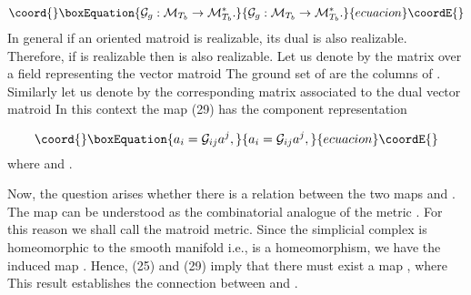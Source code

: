 \documentclass[a4paper,12pt]{article}
\begin{document}
\begin{equation}\coord{}\boxEquation{
\mathcal{G}_{g}:\mathcal{M}_{T_{b}}\rightarrow \mathcal{M}_{T_{b}}^{\ast }.
\label{29}
}{
\mathcal{G}_{g}:\mathcal{M}_{T_{b}}\rightarrow \mathcal{M}_{T_{b}}^{\ast }.
}{ecuacion}\coordE{}\end{equation}
In general if an oriented matroid is realizable, its dual is also
realizable. Therefore, if \coordHE{} is realizable then \coordHE{} is also realizable. Let us denote by \coordHE{} the \coordHE{}
matrix over a field \coordHE{} representing the vector matroid \coordHE{} The ground set \coordHE{} of \coordHE{} are the columns
of \coordHE{}. Similarly let us denote by \coordHE{} the corresponding matrix
associated to the dual vector matroid \coordHE{} In
this context the map (29) has the component representation

\begin{equation}\coord{}\boxEquation{
a_{i}=\mathcal{G}_{ij}a^{j},  \label{30}
}{
a_{i}=\mathcal{G}_{ij}a^{j},  }{ecuacion}\coordE{}\end{equation}
where \coordHE{} and \coordHE{}.

Now, the question arises whether there is a relation between the two maps \coordHE{}
and \coordHE{}. The map \coordHE{} can be understood as the
combinatorial analogue of the metric \coordHE{}. For this reason we shall call \coordHE{} the matroid metric. Since the simplicial complex \coordHE{}
is homeomorphic to the smooth manifold \coordHE{} i.e., \coordHE{} is a homeomorphism, we have the induced map \coordHE{}. Hence, (25) and (29) imply that there must
exist a map \coordHE{},
where \coordHE{} This result establishes the
connection between \coordHE{} and \coordHE{}.
\end{document}
